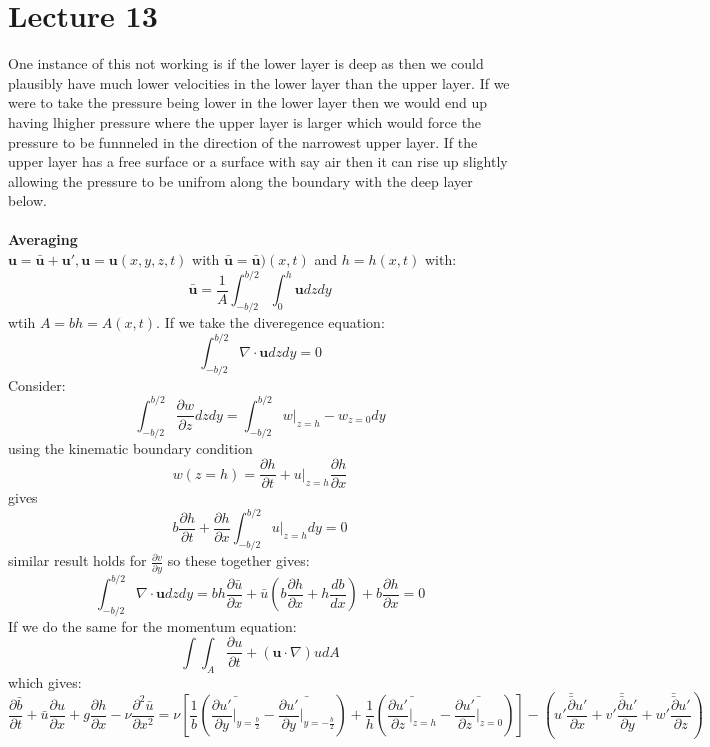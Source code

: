 \documentclass{article}
\begin{document}
     \section{Lecture 13}
     One instance of this not working is if the lower layer is deep as then we could plausibly have much lower velocities in the lower layer than the upper layer. If we were to take the pressure being lower in the lower layer then we would end up having lhigher pressure where the upper layer is larger which would force the pressure to be funnneled in the direction of the narrowest upper layer. If the upper layer has a free surface or a surface with say air then it can rise up slightly allowing the pressure to be unifrom along the boundary with the deep layer below.\\\\
     \textbf{Averaging}\\
     $\bm u = \bar{\bm u} + \bm u', \bm u = \bm u(x,y,z,t)$ with $\bar{\bm u} = \bar{\bm u})(x,t)$ and $h = h(x,t)$ with:
     $$
     \bar{\bm u} = \frac{1}{A} \int^{b/2}_{-b/2} \int_0^h \bm u dz dy
     $$
     wtih $A= bh = A(x,t)$. If we take the diveregence equation:
     $$
      \int^{b/2}_{-b/2} \nabla \cdot \bm u dz dy = 0
     $$
     Consider:
     $$
      \int^{b/2}_{-b/2} \frac{\partial w}{\partial z} dz dy = \int_{-b/2}^{b/2} w|_{z=h} - w_{z=0} dy
     $$
     using the kinematic boundary condition
     $$
      w(z=h) = \frac{\partial h}{\partial t} + u|_{z=h} \frac{\partial h}{\partial x}
     $$
     gives
     $$
     b \frac{\partial h}{\partial t}  + \frac{\partial h}{\partial x} \int^{b/2}_{-b/2} u|_{z=h} dy = 0
     $$
     similar result holds for $\frac{\partial v}{\partial y}$ so these together gives:
     $$
      \int^{b/2}_{-b/2} \nabla \cdot \bm u dz dy = b h \frac{\partial \bar u}{\partial x} + \bar u( b \frac{\partial h}{\partial x} + h \frac{db}{dx} ) + b \frac{\partial h}{\partial x} = 0
     $$
     If we do the same for the momentum equation:
     $$
     \int \int_A \frac{\partial u}{\partial t} + (\bm u \cdot \nabla) u dA 
     $$
     which gives:
     $$
     \frac{\partial \bar b}{\partial t} + \bar u \frac{\partial u}{\partial x} +g \frac{\partial h}{\partial x} - \nu \frac{\partial^2 \bar u}{\partial x^2} = \nu[ \frac{1}{b} ( \bar{\frac{\partial u'}{\partial y}|_{y = \frac{b}{2}}} - \bar{\frac{\partial u'}{\partial y} |_{y=- \frac{b}{2}}}) + \frac{1}{h} ( \bar{ \frac{\partial u'}{\partial z}|_{z=h} } - \bar{ \frac{\partial u'}{\partial z}|_{z=0}} )]- ( \bar{\bar{ u' \frac{\partial u'}{\partial x}}} + \bar{\bar{ v' \frac{\partial u'}{\partial y}}} + \bar{\bar{w' \frac{\partial u'}{\partial z}}})
     $$
\end{document}
